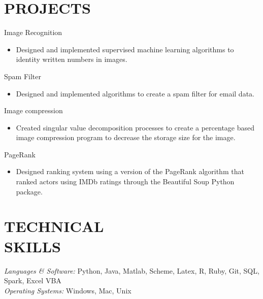 \documentclass[margin, 8pt]{res} %
\begin{document}
\begin{resume}
\section{PROJECTS}Image Recognition
		\begin{itemize} \itemsep -2pt
		\item Designed and implemented supervised machine learning algorithms to identity written numbers in images.
		\end{itemize}
		Spam Filter
		\begin{itemize} \itemsep -2pt
		\item Designed and implemented algorithms to create a spam filter for email data.
		\end{itemize}
		Image compression
		\begin{itemize} \itemsep -2pt
		\item Created singular value decomposition processes to create a percentage based image compression program to decrease the storage size for the image.
		\end{itemize}
		PageRank
		\begin{itemize} \itemsep -2pt
		\item Designed ranking system using a version of the PageRank algorithm that ranked actors using IMDb ratings through the Beautiful Soup Python package.
		\end{itemize}

\section{TECHNICAL \\ SKILLS} {\sl Languages \& Software:} Python, Java, Matlab, 
         Scheme, Latex, R, Ruby, Git, SQL, Spark, Excel VBA\\
                {\sl Operating Systems:} Windows, Mac, Unix\\
								

\end{resume}
\end{document}
